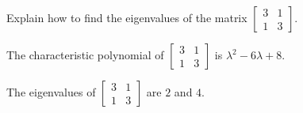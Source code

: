 
\begin{exerciseStatement}


Explain how to find the eigenvalues of the matrix \( \left[\begin{array}{cc}
3 & 1 \\
1 & 3
\end{array}\right] \).


\end{exerciseStatement}
    
\begin{exerciseAnswer} 


The characteristic polynomial of \( \left[\begin{array}{cc}
3 & 1 \\
1 & 3
\end{array}\right] \) is \( \lambda^{2} - 6 \lambda + 8 \).



The eigenvalues of \( \left[\begin{array}{cc}
3 & 1 \\
1 & 3
\end{array}\right] \) are \( 2 \) and \( 4 \).


\end{exerciseAnswer}
    
